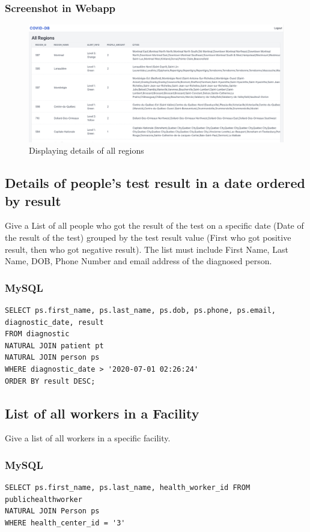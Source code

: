 \documentclass{article}
\begin{document}
\subsubsection{Screenshot in Webapp}

\begin{figure}[H]
    \centering
    \includegraphics[scale=0.25]{imgs/allregions.png}
    \caption{Displaying details of all regions}
\end{figure}

\subsection{Details of people's test result in a date ordered by result}
Give a List of all people who got the result of the test on a specific date
(Date of the result of the test) grouped by the test result value (First who got
positive result, then who got negative result). The list must include First
Name, Last Name, DOB, Phone Number and email address of the diagnosed
person. 

\subsubsection{MySQL}
\begin{verbatim}
SELECT ps.first_name, ps.last_name, ps.dob, ps.phone, ps.email, diagnostic_date, result
FROM diagnostic
NATURAL JOIN patient pt
NATURAL JOIN person ps
WHERE diagnostic_date > '2020-07-01 02:26:24'
ORDER BY result DESC;
\end{verbatim}

\subsection{List of all workers in a Facility}
Give a list of all workers in a specific facility. 

\subsubsection{MySQL}
\begin{verbatim}
SELECT ps.first_name, ps.last_name, health_worker_id FROM publichealthworker
NATURAL JOIN Person ps
WHERE health_center_id = '3'
\end{verbatim}
\end{document}
